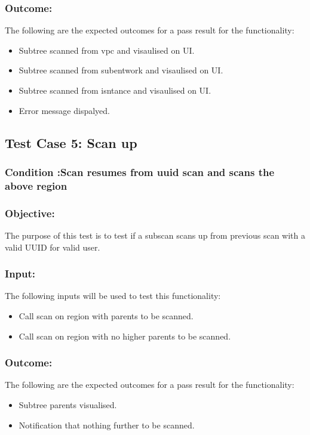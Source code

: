\documentclass[hidelinks,a4paper,12pt]{article}
\begin{document}
\subsubsection{Outcome: }
The following are the expected outcomes for a pass result for the functionality:
\begin{itemize}
\item Subtree scanned from vpc and visaulised on UI.
\item Subtree scanned from subentwork and visaulised on UI.
\item Subtree scanned from isntance and visaulised on UI.
\item Error message dispalyed.
\end{itemize}


\subsection{Test Case 5: Scan up }
\subsubsection{Condition :Scan resumes from uuid scan and scans the above region}
\subsubsection{Objective:} The purpose of this test is to test if a subscan scans up from previous scan with a valid UUID for valid user.

\subsubsection{Input:}
 The following inputs will be used to test this functionality:
\begin{itemize}
  \item Call scan on region with parents to be scanned.
   \item Call scan on region with no higher parents to be scanned.

\end{itemize}

\subsubsection{Outcome: }
The following are the expected outcomes for a pass result for the functionality:
\begin{itemize}
\item Subtree parents visualised.
\item Notification that nothing further to be scanned.

\end{itemize}
\end{document}
